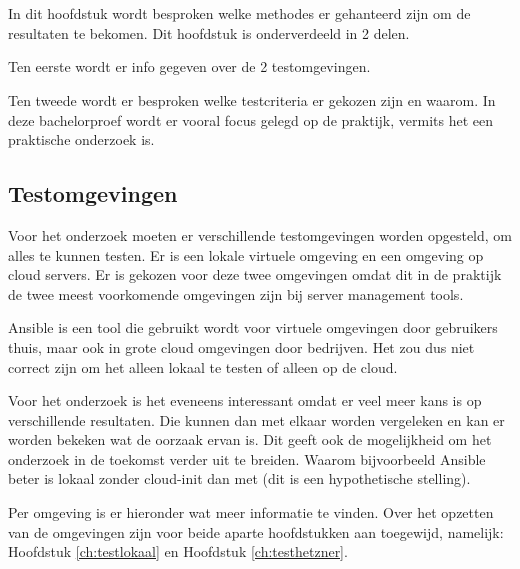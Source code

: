 
\chapter{}
\label{ch:methodologie}

In dit hoofdstuk wordt besproken welke methodes er gehanteerd zijn om de resultaten te bekomen. Dit hoofdstuk is onderverdeeld in 2 delen. 

Ten eerste wordt er info gegeven over de 2 testomgevingen. 

Ten tweede wordt er besproken welke testcriteria er gekozen zijn en waarom. In deze bachelorproef wordt er vooral focus gelegd op de praktijk, vermits het een praktische onderzoek is.

\section{Testomgevingen}
Voor het onderzoek moeten er verschillende testomgevingen worden opgesteld, om alles te kunnen testen. Er is een lokale virtuele  omgeving en een omgeving op cloud servers. Er is gekozen voor deze twee omgevingen omdat dit in de praktijk de twee meest voorkomende omgevingen zijn bij server management tools. 

Ansible is een tool die gebruikt wordt voor virtuele omgevingen door gebruikers thuis, maar ook in grote cloud omgevingen door bedrijven. Het zou dus niet correct zijn om het alleen lokaal te testen of alleen op de cloud. 

Voor het onderzoek is het eveneens interessant omdat er veel meer kans is op verschillende resultaten. Die kunnen dan met elkaar worden vergeleken en kan er worden bekeken wat de oorzaak ervan is. Dit geeft ook de mogelijkheid om het onderzoek in de toekomst verder uit te breiden. Waarom bijvoorbeeld Ansible beter is lokaal zonder cloud-init dan met (dit is een hypothetische stelling).

\newpage
Per omgeving is er hieronder wat meer informatie te vinden. Over het opzetten van de omgevingen zijn voor beide aparte hoofdstukken aan toegewijd, namelijk: Hoofdstuk \ref*{ch:testlokaal} en Hoofdstuk \ref*{ch:testhetzner}.

